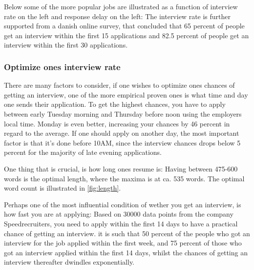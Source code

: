 Below some of the more popular jobs are illustrated as a function of interview
rate on the left and response delay on the left:
The interview rate is further supported from a danish online survey, that concluded
that 65 percent of people get an interview within the first 15 applications and
82.5 percent of people get an interview within the first 30 applications.\cite{Amount_of_applications}

\subsubsection{Optimize ones interview rate}
There are many factors to consider, if one wishes to optimize ones
chances of getting an interview, one of the more empirical proven ones
is what time and day one sends their application.
To get the highest chances, you have to apply between early Tuesday morning
and Thursday before noon using the employers local time. Monday is even better,
increasing your chances by 46 percent in regard to the average.
If one should apply on another day, the most important factor is that
it's done before 10AM, since the interview chances drops below 5 percent for
the majority of late evening applications.\cite{Best_time_and_date}

One thing that is crucial, is how long ones resume is:
Having between 475-600 words is the optimal length, where the maxima is at
ca. 535 words. The optimal word count is illustrated in \vref{fig:length}.

Perhaps one of the most influential condition of wether you get an interview,
is how fast you are at applying:
Based on 30000 data points from the company Speedrecruiters, you need
to apply within the first 14 days to have a practical chance of getting an
interview. it is such that 50 percent of the people who got an interview
for the job applied within the first week, and 75 percent of those who
got an interview applied within the first 14 days, whilst the chances of
getting an interview thereafter dwindles exponentially.\cite{Best_time_and_dateV2}

